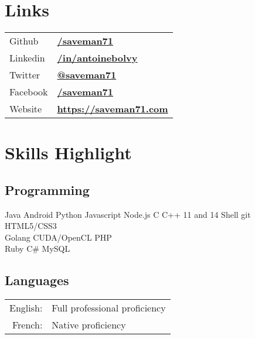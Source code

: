\documentclass[
  english,
  letterpaper
]{resume-openfont}
\begin{document}
\begin{minipage}[t]{0.31\textwidth}
\section{Links}
\begin{tabular}{@{}l@{\hskip 0.5em}l}
Github & \href{https://github.com/saveman71}{\bf /saveman71} \\
Linkedin & \href{https://www.linkedin.com/in/antoinebolvy}{\bf /in/antoinebolvy} \\
Twitter & \href{https://twitter.com/saveman71}{\bf @saveman71} \\
Facebook & \href{https://facebook.com/saveman71}{\bf /saveman71} \\
Website & \href{https://saveman71.com}{\bf https://saveman71.com} \\
\end{tabular}
\sectionsep


\section{Skills Highlight}
\subsection{Programming}
\vspace{2pt}
Java \textbullet{} Android \textbullet{} Python \textbullet{} Javascript \textbullet{} Node.js \textbullet{} C \textbullet{} C++ 11 and 14 \textbullet{} Shell \textbullet{}  \textbullet{} git \textbullet{} HTML5/CSS3\\
\vspace{2pt}%
Golang \textbullet{} CUDA/OpenCL \textbullet{} PHP\\
\vspace{2pt}%
Ruby \textbullet{} C\# \textbullet{} MySQL
\sectionsep

\subsection{Languages}
\vspace{2pt}
\begin{tabular}{@{}r@{\hskip 0.5em}l}
English: &Full professional proficiency \\
French: &Native proficiency
\end{tabular}
\sectionsep


\end{minipage}
\end{document}
